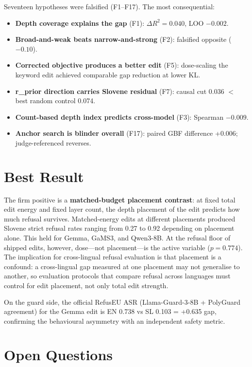\documentclass[11pt,letterpaper]{article}
\begin{document}
Seventeen hypotheses were falsified (F1--F17). The most consequential:
\begin{itemize}
\item \textbf{Depth coverage explains the gap} (F1): $\Delta R^2 = 0.040$, LOO $-0.002$.
\item \textbf{Broad-and-weak beats narrow-and-strong} (F2): falsified opposite ($-0.10$).
\item \textbf{Corrected objective produces a better edit} (F5): dose-scaling the keyword edit achieved comparable gap reduction at lower KL.
\item \textbf{r\_prior direction carries Slovene residual} (F7): causal cut 0.036 $<$ best random control 0.074.
\item \textbf{Count-based depth index predicts cross-model} (F3): Spearman $-0.009$.
\item \textbf{Anchor search is blinder overall} (F17): paired GBF difference +0.006; judge-referenced reverses.
\end{itemize}

\section{Best Result}

The firm positive is a \textbf{matched-budget placement contrast}: at fixed total edit energy and fixed layer count, the depth placement of the edit predicts how much refusal survives. Matched-energy edits at different placements produced Slovene strict refusal rates ranging from 0.27 to 0.92 depending on placement alone. This held for Gemma, GaMS3, and Qwen3-8B. At the refusal floor of shipped edits, however, dose---not placement---is the active variable ($p = 0.774$). The implication for cross-lingual refusal evaluation is that placement is a confound: a cross-lingual gap measured at one placement may not generalise to another, so evaluation protocols that compare refusal across languages must control for edit placement, not only total edit strength.

On the guard side, the official RefusEU ASR (Llama-Guard-3-8B + PolyGuard agreement) for the Gemma edit is EN 0.738 vs SL 0.103 = +0.635 gap, confirming the behavioural asymmetry with an independent safety metric.

\section{Open Questions}
\end{document}
